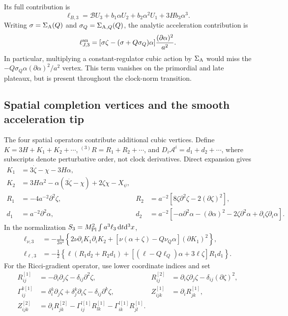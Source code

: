\documentclass[aps,prd,reprint,onecolumn,notitlepage,nofootinbib,longbibliography,floatfix]{revtex4-2}
\theoremstyle{scstyle}
\theoremstyle{definition}
\theoremstyle{remark}
\newcommand{\dd}{\mathrm{d}}
\newcommand{\mpl}{M_{\rm Pl}}
\newcommand{\cB}{\mathcal B}
\newcommand{\sigA}{\Sigma_{\rm A}}
\newcommand{\cR}{{}^{(3)}\!R}
\begin{document}
Its full contribution is
\begin{equation}
 \ell_{B,3}=\cB U_3+b_1\alpha U_2+b_2\alpha^2U_1+3Hb_3\alpha^3.
\label{eq:eftB3}
\end{equation}
Writing $\sigma=\sigA(Q)$ and $\sigma_Q=\sigA{}_{,Q}(Q)$, the analytic acceleration contribution is
\begin{equation}
 \ell_{J,3}^{\rm an}
 =[\sigma\zeta-(\sigma+Q\sigma_Q)\alpha]
 \frac{(\partial\alpha)^2}{a^2}.
\label{eq:eftJ3analytic}
\end{equation}
In particular, multiplying a constant-regulator cubic action by $\sigA$ would miss the $-Q\sigma_Q\alpha(\partial\alpha)^2/a^2$ vertex. This term vanishes on the primordial and late plateaux, but is present throughout the clock-norm transition.

\subsection{Spatial completion vertices and the smooth acceleration tip}
The four spatial operators contribute additional cubic vertices. Define
$K=3H+K_1+K_2+\cdots$, $\cR=R_1+R_2+\cdots$, and
$D_i\mathcal A^i=d_1+d_2+\cdots$, where subscripts denote perturbative
order, not clock derivatives. Direct expansion gives
\begin{align}
K_1&=3\dot\zeta-\chi-3H\alpha,\nonumber\\
K_2&=3H\alpha^2-\alpha(3\dot\zeta-\chi)+2\zeta\chi-X_\psi,\nonumber\\
R_1&=-4a^{-2}\partial^2\zeta,
& R_2&=a^{-2}\left[8\zeta\partial^2\zeta-2(\partial\zeta)^2\right],\nonumber\\
d_1&=a^{-2}\partial^2\alpha,
& d_2&=a^{-2}\left[-\alpha\partial^2\alpha-(\partial\alpha)^2
-2\zeta\partial^2\alpha+\partial_i\zeta\partial_i\alpha\right].
\label{eq:fullSpatialJets}
\end{align}
In the normalization $S_3=\mpl^2\int a^3\ell_3\,\dd t\dd^3x$,
\begin{align}
\ell_{\nu,3}&=-\frac{1}{2a^2}\left\{2\nu\partial_iK_1\partial_iK_2
+\left[\nu(\alpha+\zeta)-Q\nu_Q\alpha\right](\partial K_1)^2\right\},
\label{eq:fullNuCubic}\\
\ell_{\ell,3}&=-\frac12\left\{\ell(R_1d_2+R_2d_1)
+\left[(\ell-Q\ell_Q)\alpha+3\ell\zeta\right]R_1d_1\right\}.
\label{eq:fullEllCubic}
\end{align}
For the Ricci-gradient operator, use lower coordinate indices and set
\begin{align}
R^{[1]}_{ij}&=-\partial_i\partial_j\zeta-\delta_{ij}\partial^2\zeta,
& R^{[2]}_{ij}&=\partial_i\zeta\partial_j\zeta-\delta_{ij}(\partial\zeta)^2,
\nonumber\\
\Gamma^{k[1]}_{ij}&=\delta_i^k\partial_j\zeta+\delta_j^k\partial_i\zeta
-\delta_{ij}\partial^k\zeta,
& Z^{[1]}_{ijk}&=\partial_iR^{[1]}_{jk},\nonumber\\
Z^{[2]}_{ijk}&=\partial_iR^{[2]}_{jk}
-\Gamma^{l[1]}_{ij}R^{[1]}_{lk}-\Gamma^{l[1]}_{ik}R^{[1]}_{jl}.
\label{eq:fullRicciJets}
\end{align}
\end{document}

